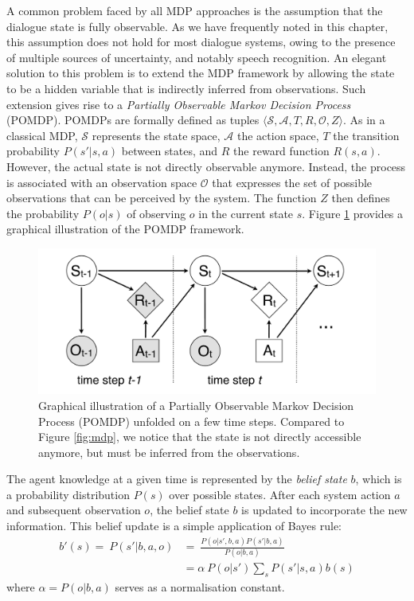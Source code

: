 A common problem faced by all MDP approaches is the assumption that the dialogue state is fully observable. As we have frequently noted in this chapter, this assumption does not hold for most dialogue systems, owing to the presence of multiple sources of uncertainty, and notably speech recognition.  An elegant solution to this problem is to extend the MDP framework by allowing the state to be a hidden variable that is indirectly inferred from observations.  Such extension gives rise to a  \textit{Partially Observable Markov Decision Process} (POMDP).  POMDPs are formally defined as tuples $\langle \mathcal{S}, \mathcal{A}, T, R, \mathcal{O}, Z \rangle$.  As in a classical MDP, $\mathcal{S}$ represents the state space, $\mathcal{A}$ the action space, $T$ the transition probability $P(s'|s,a)$ between states, and $R$ the reward function $R(s,a)$.  However, the actual state is not directly observable anymore.  Instead, the process is associated with an observation space $\mathcal{O}$ that expresses the set of possible observations that can be perceived by the system. The function $Z$ then defines the probability $P(o|s)$ of observing $o$ in the current state $s$.  Figure \ref{fig:pomdp} provides a graphical illustration of the POMDP framework. 

\begin{figure}[h]
\centering
\includegraphics[scale=0.25]{imgs/POMDP.pdf}
\caption{Graphical illustration of a Partially Observable Markov Decision Process (POMDP) unfolded on a few time steps.  Compared to Figure \ref{fig:mdp}, we notice that the state is not directly accessible anymore, but must be inferred from the observations. }
\label{fig:pomdp}
\end{figure}

The agent knowledge at a given time is represented by the \textit{belief state} $b$, which is a probability distribution $P(s)$ over possible states.  After each system action $a$ and subsequent observation $o$, the belief state $b$ is updated to incorporate the new information.  This belief update is a simple application of Bayes rule: 
\begin{align}
b'(s) = \ \!P(s'|b, a,o) & = \ \frac{P(o|s',b,a) P(s'|b,a)}{P(o|b,a)} \\[3mm]
& = \alpha \ P(o|s') \sum_{s} P(s'|s,a) b(s) \label{eq:update}
\end{align}
where $\alpha = P(o|b,a)$ serves as a normalisation constant. 

